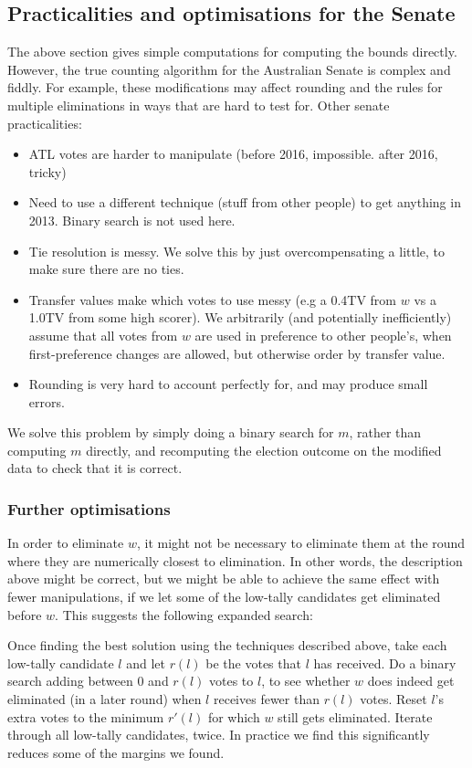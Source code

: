 \documentclass[10pt,a4paper]{article}
\begin{document}
\subsection{Practicalities and optimisations for the Senate}
The above section gives simple computations for computing the bounds directly.  However, the true counting algorithm for the Australian Senate is complex and fiddly.  For example, these modifications may affect rounding and the rules for multiple eliminations in ways that are hard to test for.  Other senate practicalities:
\begin{itemize}
\item  ATL votes are harder to manipulate (before 2016, impossible. after 2016, tricky)
\item  Need to use a different technique (stuff from other people) to get anything in 2013. Binary search is not used here.
\item  Tie resolution is messy.  We solve this by just overcompensating a little, to make sure there are no ties.
\item  Transfer values make which votes  to use messy (e.g a 0.4TV from $w$ vs a 1.0TV from some high scorer). We arbitrarily (and potentially inefficiently) assume that all votes from $w$ are used in preference to other people’s, when first-preference changes are allowed, but otherwise order by transfer value.    
\item Rounding is very hard to account perfectly for, and may produce small errors.
\end{itemize}

We solve this problem by simply doing a binary search for $m$, rather than computing $m$ directly, and recomputing the election outcome on the modified data to check that it is correct. 

\subsubsection{Further optimisations}
In order to eliminate $w$, it might not be necessary to eliminate them at the round where they are numerically closest to elimination.  In other words, the description above might be correct, but we might be able to achieve the same effect with fewer manipulations, if we let some of the low-tally candidates get eliminated before $w$.  This suggests the following expanded search:

Once finding the best solution using the techniques described above, take each low-tally candidate $l$ and let $r(l)$ be the votes that $l$ has received.  Do a binary search adding between 0 and $r(l)$ votes to $l$, to see whether $w$ does indeed get eliminated (in a later round) when $l$ receives fewer than $r(l)$ votes.  Reset $l$'s extra votes to the minimum $r'(l)$ for which $w$ still gets eliminated.  Iterate through all low-tally candidates, twice.  In practice we find this significantly reduces some of the margins we found.
\end{document}
